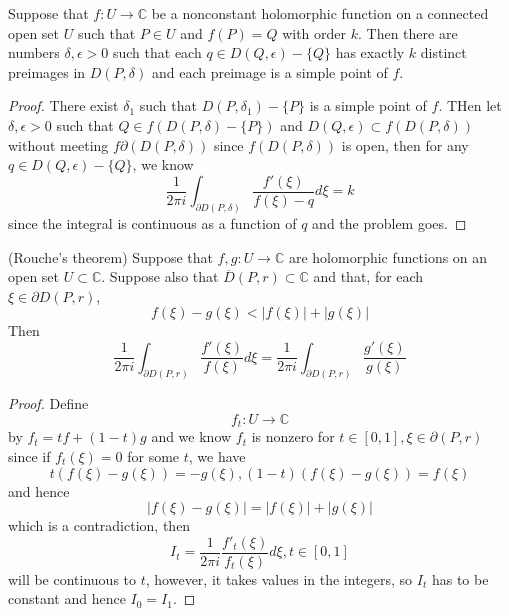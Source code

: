 \documentclass[lang=en, color=blue, ]{elegantbook}
\newcommand{\C}{\mathbb{C}}
\begin{document}
\begin{theorem}
    Suppose that $f:U\to\C$ be a nonconstant holomorphic function on a connected open set $U$ such that $P\in U$ and $f(P) = Q$ with order $k$. Then there are numbers $\delta,\epsilon > 0$ such that each $q\in D(Q,\epsilon)-\{Q\}$ has exactly $k$ distinct preimages in $D(P,\delta)$ and each preimage is a simple point of $f$.
\end{theorem}
\begin{proof}
    There exist $\delta_1$ such that $D(P,\delta_1)-\{P\}$ is a simple point of $f$. THen let $\delta,\epsilon > 0$ such that $Q\in f(D(P,\delta)-\{P\})$ and $D(Q,\epsilon) \subset f(D(P,\delta))$ without meeting $f\partial(D(P,\delta))$ since $f(D(P,\delta))$ is open, then for any $q\in D(Q,\epsilon)-\{Q\}$, we know
    \[\dfrac{1}{2\pi i}\int_{\partial D(P,\delta)} \dfrac{f'(\xi)}{f(\xi)-q}d\xi = k\]
    since the integral is continuous as a function of $q$ and the problem goes.
\end{proof}

\begin{theorem}
    (Rouche's theorem) Suppose that $f,g:U\to\C$ are holomorphic functions on an open set $U\subset\C$. Suppose also that $\overline{D}(P,r)\subset\C$ and that, for each $\xi\in\partial D(P,r)$,
    \[f(\xi)-g(\xi) < |f(\xi)|+|g(\xi)|\]
    Then
    \[
    \dfrac{1}{2\pi i}\int_{\partial D(P,r)} \dfrac{f'(\xi)}{f(\xi)} d\xi = \dfrac{1}{2\pi i}\int_{\partial D(P,r)} \dfrac{g'(\xi)}{g(\xi)}
    \]
\end{theorem}
\begin{proof}
    Define
    \[
    f_t:U\to\C
    \]
    by $f_t = tf+(1-t)g$ and we know $f_t$ is nonzero for $t\in[0,1], \xi \in \partial (P,r)$ since if $f_t(\xi) =  0$ for some $t$, we have
    \[t(f(\xi)-g(\xi)) = -g(\xi),(1-t)(f(\xi)-g(\xi)) = f(\xi)\]
    and hence
    \[|f(\xi)-g(\xi)| = |f(\xi)|+|g(\xi)|\]
    which is a contradiction, then
    \[I_t  =\dfrac{1}{2\pi i}\dfrac{f'_t(\xi)}{f_t(\xi)}d\xi, t\in [0,1]\]
    will be continuous to $t$, however, it takes values in the integers, so $I_t$ has to be constant and hence $I_0 = I_1$.
\end{proof}
\end{document}
